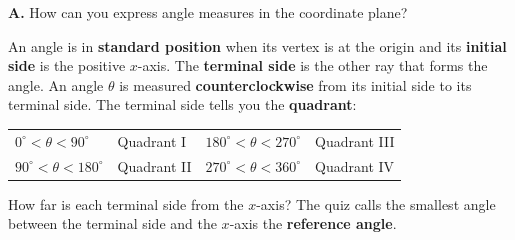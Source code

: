 \begin{minipage}[t]{0.66\textwidth}
\textbf{A.} How can you express angle measures in the coordinate plane?

An angle is in \textbf{standard position} when its vertex is at the origin and its \textbf{initial side} is the positive $x$-axis. The \textbf{terminal side} is the other ray that forms the angle. An angle $\theta$ is measured \textbf{counterclockwise} from its initial side to its terminal side. The terminal side tells you the \textbf{quadrant}:

\small
\begin{tabular}{@{}ll@{\qquad}ll@{}}
$0^\circ<\theta<90^\circ$ & Quadrant I & $180^\circ<\theta<270^\circ$ & Quadrant III\\
$90^\circ<\theta<180^\circ$ & Quadrant II & $270^\circ<\theta<360^\circ$ & Quadrant IV
\end{tabular}
\normalsize
\end{minipage}\hfill
\begin{minipage}[t]{0.31\textwidth}
\vspace{2pt}\centering
{}
\end{minipage}

\vspace{2pt}
How far is each terminal side from the $x$-axis? The quiz calls the smallest angle between the terminal side and the $x$-axis the \textbf{reference angle}.

